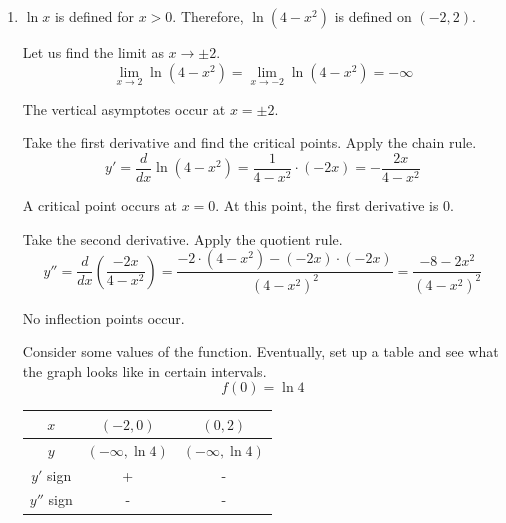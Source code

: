 \documentclass[a4paper, 12pt]{article}
\begin{document}
\begin{enumerate}[leftmargin=*,label=\textbf{\arabic*.}]
\item $\ln x$ is defined for $x>0$. Therefore, $\ln\left(4-x^2\right)$ is defined on $(-2,2)$.

Let us find the limit as $x\to\pm2$.
\[\lim_{x\to2}\ln\left(4-x^2\right)=\lim_{x\to-2}\ln\left(4-x^2\right)=-\infty\]

The vertical asymptotes occur at $x=\pm2$.

Take the first derivative and find the critical points. Apply the chain rule.
\[y'=\frac d{dx}\ln\left(4-x^2\right)=\frac1{4-x^2}\cdot(-2x)=-\frac{2x}{4-x^2}\]

A critical point occurs at $x=0$. At this point, the first derivative is $0$.

Take the second derivative. Apply the quotient rule.
\[y''=\frac d{dx}\left(\frac{-2x}{4-x^2}\right)=\frac{-2\cdot(4-x^2)-(-2x)\cdot(-2x)}{\left(4-x^2\right)^2}=\frac{-8-2x^2}{\left(4-x^2\right)^2}\]

No inflection points occur.

Consider some values of the function. Eventually, set up a table and see what the graph looks like in certain intervals.
\[f(0)=\ln4\]

\begin{center}
    \begin{tabular}{|c|cc|} 
    \hline
        $x$&$\left(-2,0\right)$&$\left(0,2\right)$\\
        \hline
        $y$&$(-\infty,\ln4)$&$(-\infty,\ln4)$\\
        \hline
        $y'$ sign&+&-\\
        \hline
        $y''$ sign&-&-\\
        \hline
    \end{tabular}
\end{center}

\begin{center}
\end{center}


\end{enumerate}
\end{document}
